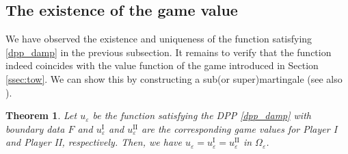 \documentclass[english]{amsart}
\newcommand{\eps}{\varepsilon}
\theoremstyle{plain}
\newtheorem{theorem}[definition]{Theorem}
\theoremstyle{definition}
\theoremstyle{remark}
\numberwithin{equation}{section}
\begin{document}
\subsection{The existence of the game value}
We have observed the existence and uniqueness of the function satisfying \eqref{dpp_damp} in the previous subsection.
It remains to verify that the function indeed coincides with the value function of the game introduced in Section \ref{ssec:tow}.
We can show this by constructing a sub(or super)martingale (see also \cite[Theorem 3.2]{MR3161602}).

\begin{theorem}Let $u_{\eps}$ be the function satisfying the DPP \eqref{dpp_damp} with boundary data $F$ and
$u_{\eps}^{\textrm{I}}$ and $u_{\eps}^{\textrm{II}}$ are the corresponding game values for Player I and Player II, respectively.
Then, we have $u_{\eps}=u_{\eps}^{\textrm{I}}=u_{\eps}^{\textrm{II}}$ in $\Omega_{\eps}$.
\end{theorem}
\end{document}

